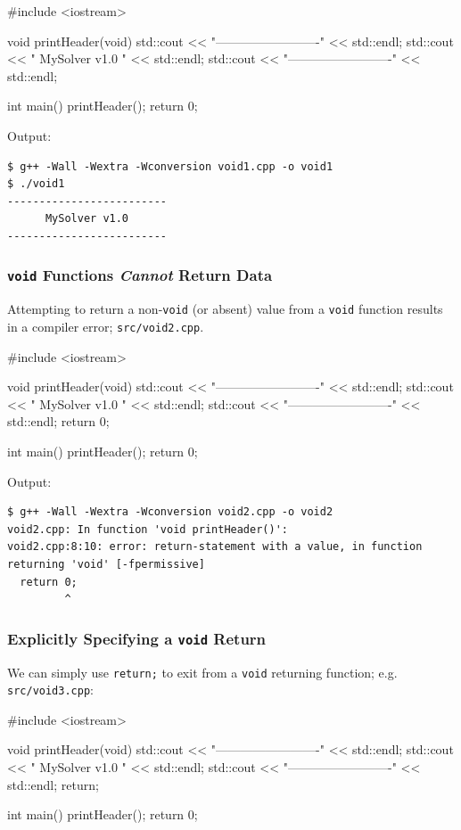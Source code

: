 \documentclass[12pt,letterpaper,twoside]{article}
\begin{document}
\begin{cpp}
#include <iostream>

void printHeader(void) {
  std::cout << "-------------------------" << std::endl;
  std::cout << "      MySolver v1.0      " << std::endl;
  std::cout << "-------------------------" << std::endl;
}

int main() {
  printHeader();
  return 0;
}
\end{cpp}

Output:

\begin{verbatim}
$ g++ -Wall -Wextra -Wconversion void1.cpp -o void1
$ ./void1
-------------------------
      MySolver v1.0
-------------------------
\end{verbatim}

\subsubsection{\texttt{void} Functions \emph{Cannot} Return Data} Attempting to return
a non-\texttt{void} (or absent) value from a \texttt{void} function results in a compiler 
error; \texttt{src/void2.cpp}.

\begin{cpp}
#include <iostream>

void printHeader(void) {
  std::cout << "-------------------------" << std::endl;
  std::cout << "      MySolver v1.0      " << std::endl;
  std::cout << "-------------------------" << std::endl;
  return 0;
}

int main() {
  printHeader();
  return 0;
}
\end{cpp}

Output:

\begin{verbatim}
$ g++ -Wall -Wextra -Wconversion void2.cpp -o void2
void2.cpp: In function 'void printHeader()':
void2.cpp:8:10: error: return-statement with a value, in function returning 'void' [-fpermissive]
  return 0;
         ^
\end{verbatim}

\subsubsection{Explicitly Specifying a \texttt{void} Return} We can simply use \texttt{return;} to exit from a \texttt{void} returning function; e.g.
\texttt{src/void3.cpp}:

\begin{cpp}
#include <iostream>

void printHeader(void) {
  std::cout << "-------------------------" << std::endl;
  std::cout << "      MySolver v1.0      " << std::endl;
  std::cout << "-------------------------" << std::endl;
  return;
}

int main() {
  printHeader();
  return 0;
}
\end{cpp}
\end{document}
